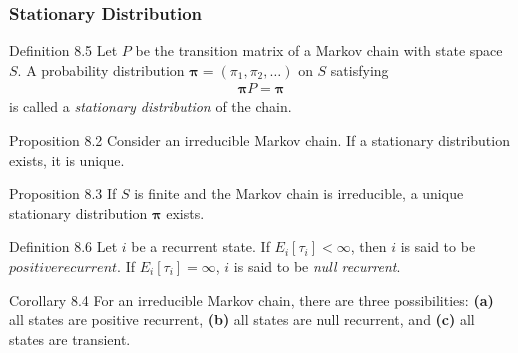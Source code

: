 \subsubsection{Stationary Distribution}
\begin{boks}{Definition 8.5}
  Let $P$ be the transition matrix of a Markov chain with state space $S$. A probability distribution $\boldsymbol{\pi} = (\pi_1, \pi_2, \ldots)$ on $S$ satisfying
  \begin{align*}
    \boldsymbol{\pi} P = \boldsymbol{\pi}
  \end{align*}
  is called a \textit{stationary distribution} of the chain.
\end{boks}
\begin{boks}{Proposition 8.2}
  Consider an irreducible Markov chain. If a stationary distribution exists, it is unique.
\end{boks}
\begin{boks}{Proposition 8.3}
  If $S$ is finite and the Markov chain is irreducible, a unique stationary distribution $\boldsymbol{\pi}$ exists.
\end{boks}
\begin{boks}{Definition 8.6}
  Let $i$ be a recurrent state. If $E_i[\tau_i] < \infty$, then $i$ is said to be $positive recurrent$. If $E_i[\tau_i] = \infty$, $i$ is said to be \textit{null recurrent}.
\end{boks}
\begin{boks}{Corollary 8.4}
  For an irreducible Markov chain, there are three possibilities: \textbf{(a)} all states are positive recurrent, \textbf{(b)} all states are null recurrent, and \textbf{(c)} all states are transient.
\end{boks}
